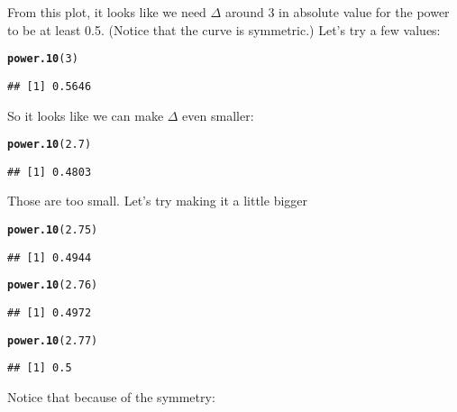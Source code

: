 \documentclass[addpoints,12pt]{exam}\usepackage[]{graphicx}\usepackage[]{color}
\makeatletter
\newcommand{\hlnum}[1]{\textcolor[rgb]{0.686,0.059,0.569}{#1}}%
\newcommand{\hlstd}[1]{\textcolor[rgb]{0.345,0.345,0.345}{#1}}%
\newcommand{\hlkwd}[1]{\textcolor[rgb]{0.737,0.353,0.396}{\textbf{#1}}}%
\newenvironment{kframe}{%
 \def\at@end@of@kframe{}%
 \ifinner\ifhmode%
  \def\at@end@of@kframe{\end{minipage}}%
  \begin{minipage}{\columnwidth}%
 \fi\fi%
 \def\FrameCommand##1{\hskip\@totalleftmargin \hskip-\fboxsep
 \colorbox{shadecolor}{##1}\hskip-\fboxsep
     \hskip-\linewidth \hskip-\@totalleftmargin \hskip\columnwidth}%
 \MakeFramed {\advance\hsize-\width
   \@totalleftmargin\z@ \linewidth\hsize
   \@setminipage}}%
 {\par\unskip\endMakeFramed%
 \at@end@of@kframe}
\newenvironment{knitrout}{}{} %
\makeatother
\begin{document}
\begin{questions}
\begin{parts}
\begin{solution}
\begin{knitrout}
\end{knitrout}
From this plot, it looks like we need $\Delta$ around 3 in absolute value for the power to be at least 0.5. (Notice that the curve is symmetric.) Let's try a few values:
\begin{knitrout}
\color{fgcolor}\begin{kframe}
\begin{alltt}
\hlkwd{power.10}\hlstd{(}\hlnum{3}\hlstd{)}
\end{alltt}
\begin{verbatim}
## [1] 0.5646
\end{verbatim}
\end{kframe}
\end{knitrout}
So it looks like we can make $\Delta$ even smaller:
\begin{knitrout}
\color{fgcolor}\begin{kframe}
\begin{alltt}
\hlkwd{power.10}\hlstd{(}\hlnum{2.7}\hlstd{)}
\end{alltt}
\begin{verbatim}
## [1] 0.4803
\end{verbatim}
\end{kframe}
\end{knitrout}
Those are too small. Let's try making it a little bigger
\begin{knitrout}
\color{fgcolor}\begin{kframe}
\begin{alltt}
\hlkwd{power.10}\hlstd{(}\hlnum{2.75}\hlstd{)}
\end{alltt}
\begin{verbatim}
## [1] 0.4944
\end{verbatim}
\begin{alltt}
\hlkwd{power.10}\hlstd{(}\hlnum{2.76}\hlstd{)}
\end{alltt}
\begin{verbatim}
## [1] 0.4972
\end{verbatim}
\begin{alltt}
\hlkwd{power.10}\hlstd{(}\hlnum{2.77}\hlstd{)}
\end{alltt}
\begin{verbatim}
## [1] 0.5
\end{verbatim}
\end{kframe}
\end{knitrout}
Notice that because of the symmetry:

\end{solution}
\end{parts}
\end{questions}
\end{document}
